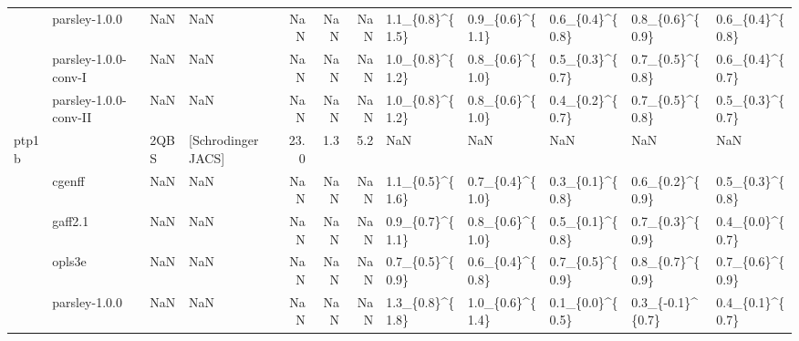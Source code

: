 \begin{tabular}{llllrrrlllll}
     & parsley-1.0.0 &         NaN &                 NaN &         NaN &      NaN &            NaN &  1.1\_\{0.8\}\textasciicircum \{1.5\} &  0.9\_\{0.6\}\textasciicircum \{1.1\} &  0.6\_\{0.4\}\textasciicircum \{0.8\} &    0.8\_\{0.6\}\textasciicircum \{0.9\} &   0.6\_\{0.4\}\textasciicircum \{0.8\} \\
     & parsley-1.0.0-conv-I &         NaN &                 NaN &         NaN &      NaN &            NaN &  1.0\_\{0.8\}\textasciicircum \{1.2\} &  0.8\_\{0.6\}\textasciicircum \{1.0\} &  0.5\_\{0.3\}\textasciicircum \{0.7\} &    0.7\_\{0.5\}\textasciicircum \{0.8\} &   0.6\_\{0.4\}\textasciicircum \{0.7\} \\
     & parsley-1.0.0-conv-II &         NaN &                 NaN &         NaN &      NaN &            NaN &  1.0\_\{0.8\}\textasciicircum \{1.2\} &  0.8\_\{0.6\}\textasciicircum \{1.0\} &  0.4\_\{0.2\}\textasciicircum \{0.7\} &    0.7\_\{0.5\}\textasciicircum \{0.8\} &   0.5\_\{0.3\}\textasciicircum \{0.7\} \\
ptp1b &                       &        2QBS &  [Schrodinger JACS] &        23.0 &      1.3 &            5.2 &              NaN &              NaN &              NaN &                NaN &               NaN \\
     & cgenff &         NaN &                 NaN &         NaN &      NaN &            NaN &  1.1\_\{0.5\}\textasciicircum \{1.6\} &  0.7\_\{0.4\}\textasciicircum \{1.0\} &  0.3\_\{0.1\}\textasciicircum \{0.8\} &    0.6\_\{0.2\}\textasciicircum \{0.9\} &   0.5\_\{0.3\}\textasciicircum \{0.8\} \\
     & gaff2.1 &         NaN &                 NaN &         NaN &      NaN &            NaN &  0.9\_\{0.7\}\textasciicircum \{1.1\} &  0.8\_\{0.6\}\textasciicircum \{1.0\} &  0.5\_\{0.1\}\textasciicircum \{0.8\} &    0.7\_\{0.3\}\textasciicircum \{0.9\} &   0.4\_\{0.0\}\textasciicircum \{0.7\} \\
     & opls3e &         NaN &                 NaN &         NaN &      NaN &            NaN &  0.7\_\{0.5\}\textasciicircum \{0.9\} &  0.6\_\{0.4\}\textasciicircum \{0.8\} &  0.7\_\{0.5\}\textasciicircum \{0.9\} &    0.8\_\{0.7\}\textasciicircum \{0.9\} &   0.7\_\{0.6\}\textasciicircum \{0.9\} \\
     & parsley-1.0.0 &         NaN &                 NaN &         NaN &      NaN &            NaN &  1.3\_\{0.8\}\textasciicircum \{1.8\} &  1.0\_\{0.6\}\textasciicircum \{1.4\} &  0.1\_\{0.0\}\textasciicircum \{0.5\} &   0.3\_\{-0.1\}\textasciicircum \{0.7\} &   0.4\_\{0.1\}\textasciicircum \{0.7\} \\

\end{tabular}
